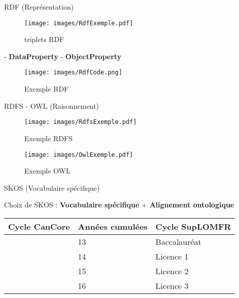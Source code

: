\begin{frame}{RDF (Représentation)}
\begin{figure}
	  \centering
	  \texttt{[image: images/RdfExemple.pdf]}
	  \caption{triplets RDF}
\end{figure}
\pause

- \textbf{DataProperty} \newline
- \textbf{ObjectProperty}

\pause

\begin{figure}
	  \centering
	  \texttt{[image: images/RdfCode.png]}
	  \caption{Exemple RDF}
\end{figure}
\end{frame}
\begin{frame}{RDFS - OWL (Raisonnement)}
\begin{figure}
	  \centering
	  \texttt{[image: images/RdfsExemple.pdf]}
	  \caption{Exemple RDFS}
\end{figure}
\pause
\begin{figure}
	  \centering
	  \texttt{[image: images/OwlExemple.pdf]}
	  \caption{Exemple OWL}
\end{figure}
\end{frame}

\begin{frame}{SKOS (Vocabulaire spécifique)}

Choix de SKOS : \textbf{Vocabulaire spécifique} + \textbf{Alignement ontologique}

\begin{table}[h]
\begin{tabular}{|l|l|l|}
\hline
Cycle CanCore     & Années cumulées & Cycle SupLOMFR \\ \hline
\multirow{4}{*}{} & 13              & Baccalauréat   \\ \cline{2-3} 
  Baccalauréat  & 14              & Licence 1      \\ \cline{2-3} 
                  & 15              & Licence 2      \\ \cline{2-3} 
                  & 16              & Licence 3      \\ \hline
\end{tabular}
\end{table}

\end{frame}
